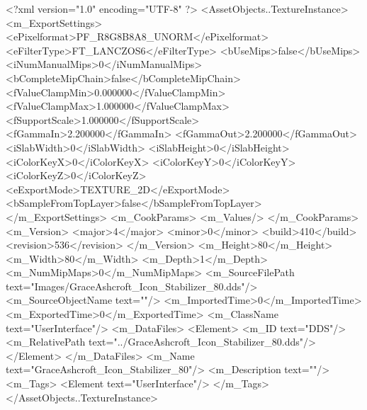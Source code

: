 <?xml version="1.0" encoding="UTF-8" ?>
<AssetObjects..TextureInstance>
	<m_ExportSettings>
		<ePixelformat>PF_R8G8B8A8_UNORM</ePixelformat>
		<eFilterType>FT_LANCZOS6</eFilterType>
		<bUseMips>false</bUseMips>
		<iNumManualMips>0</iNumManualMips>
		<bCompleteMipChain>false</bCompleteMipChain>
		<fValueClampMin>0.000000</fValueClampMin>
		<fValueClampMax>1.000000</fValueClampMax>
		<fSupportScale>1.000000</fSupportScale>
		<fGammaIn>2.200000</fGammaIn>
		<fGammaOut>2.200000</fGammaOut>
		<iSlabWidth>0</iSlabWidth>
		<iSlabHeight>0</iSlabHeight>
		<iColorKeyX>0</iColorKeyX>
		<iColorKeyY>0</iColorKeyY>
		<iColorKeyZ>0</iColorKeyZ>
		<eExportMode>TEXTURE_2D</eExportMode>
		<bSampleFromTopLayer>false</bSampleFromTopLayer>
	</m_ExportSettings>
	<m_CookParams>
		<m_Values/>
	</m_CookParams>
	<m_Version>
		<major>4</major>
		<minor>0</minor>
		<build>410</build>
		<revision>536</revision>
	</m_Version>
	<m_Height>80</m_Height>
	<m_Width>80</m_Width>
	<m_Depth>1</m_Depth>
	<m_NumMipMaps>0</m_NumMipMaps>
	<m_SourceFilePath text="Images/GraceAshcroft_Icon_Stabilizer_80.dds"/>
	<m_SourceObjectName text=""/>
	<m_ImportedTime>0</m_ImportedTime>
	<m_ExportedTime>0</m_ExportedTime>
	<m_ClassName text="UserInterface"/>
	<m_DataFiles>
		<Element>
			<m_ID text="DDS"/>
			<m_RelativePath text="../GraceAshcroft_Icon_Stabilizer_80.dds"/>
		</Element>
	</m_DataFiles>
	<m_Name text="GraceAshcroft_Icon_Stabilizer_80"/>
	<m_Description text=""/>
	<m_Tags>
		<Element text="UserInterface"/>
	</m_Tags>
</AssetObjects..TextureInstance>
